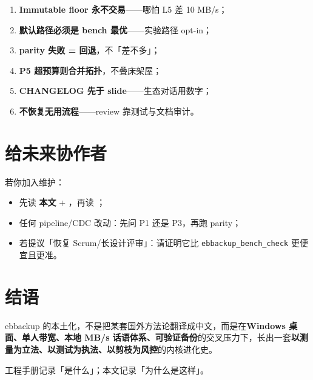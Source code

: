 \begin{philobox}[Forward 准则]
\begin{enumerate}
  \item \textbf{Immutable floor 永不交易}——哪怕 L5 差 10 MB/s；
  \item \textbf{默认路径必须是 bench 最优}——实验路径 opt-in；
  \item \textbf{parity 失败 = 回退}，不「差不多」；
  \item \textbf{P5 超预算则合并拓扑}，不叠床架屋；
  \item \textbf{CHANGELOG 先于 slide}——生态对话用数字；
  \item \textbf{不恢复无用流程}——review 靠测试与文档审计。
\end{enumerate}
\end{philobox}

\section{给未来协作者}

若你加入维护：
\begin{itemize}
  \item 先读 \textbf{本文} + ，再读 ；
  \item 任何 pipeline/CDC 改动：先问 P1 还是 P3，再跑 parity；
  \item 若提议「恢复 Scrum/长设计评审」：请证明它比 \texttt{ebbackup\_bench\_check} 更便宜且更准。
\end{itemize}

\section{结语}

ebbackup 的本土化，不是把某套国外方法论翻译成中文，而是在\textbf{Windows 桌面、单人带宽、本地 MB/s 话语体系、可验证备份}的交叉压力下，长出一套\textbf{以测量为立法、以测试为执法、以剪枝为风控}的内核进化史。

工程手册记录「是什么」；本文记录「为什么是这样」。
